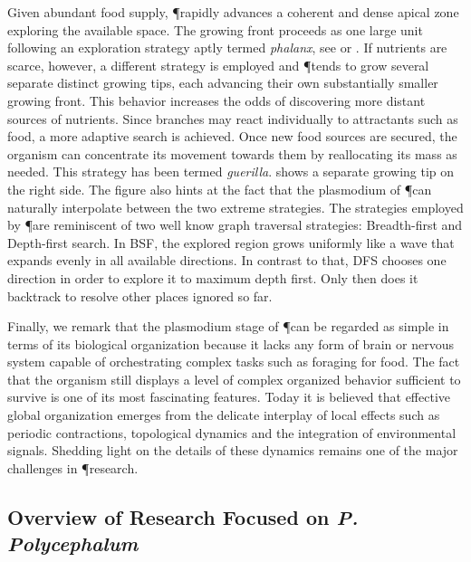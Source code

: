 		Given abundant food supply, \P rapidly advances a coherent and dense apical zone exploring the available space. The growing front proceeds as one large unit following an exploration strategy aptly termed \emph{phalanx}, see  or . If nutrients are scarce, however, a different strategy is employed and \P tends to grow several separate distinct growing tips, each advancing their own substantially smaller growing front. This behavior increases the odds of discovering more distant sources of nutrients. Since branches may react individually to attractants such as food, a more adaptive search is achieved. Once new food sources are secured, the organism can concentrate its movement towards them by reallocating its mass as needed. This strategy has been termed \emph{guerilla}.  shows a separate growing tip on the right side. The figure also hints at the fact that the plasmodium of \P can naturally interpolate between the two extreme strategies. The strategies employed by \P are reminiscent of two well know graph traversal strategies: Breadth-first and Depth-first search. In BSF, the explored region grows uniformly like a wave that expands evenly in all available directions. In contrast to that, DFS chooses one direction in order to explore it to maximum depth first. Only then does it backtrack to resolve other places ignored so far.

		Finally, we remark that the plasmodium stage of \P can be regarded as simple in terms of its biological organization because it lacks any form of brain or nervous system capable of orchestrating complex tasks such as foraging for food. The fact that the organism still displays a level of complex organized behavior sufficient to survive is one of its most fascinating features. Today it is believed that effective global organization emerges from the delicate interplay of local effects such as periodic contractions, topological dynamics and the integration of environmental signals. Shedding light on the details of these dynamics remains one of the major challenges in \P research.

		\FloatBarrier

	\subsection{Overview of Research Focused on \textit{P. Polycephalum}}

